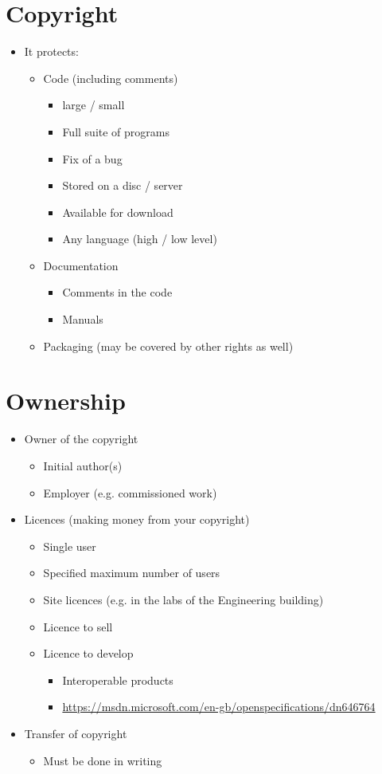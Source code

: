 \documentclass{article}
\begin{document}
\section{Copyright}
\begin{itemize}
\item It protects:
\begin{itemize}
\item Code (including comments)
\begin{itemize}
\item large / small
\item Full suite of programs
\item Fix of a bug
\item Stored on a disc / server
\item Available for download
\item Any language (high / low level)
\end{itemize}
\item Documentation
\begin{itemize}
\item Comments in the code
\item Manuals
\end{itemize}
\item Packaging (may be covered by other rights as well)
\end{itemize}
\end{itemize}



\section{Ownership}
\begin{itemize}
\item Owner of the copyright
\begin{itemize}
\item Initial author(s)
\item Employer (e.g. commissioned work)
\end{itemize}
\item Licences (making money from your copyright)
\begin{itemize}
\item Single user
\item Specified maximum number of users
\item Site licences (e.g. in the labs of the Engineering building)
\item Licence to sell
\item Licence to develop
\begin{itemize}
\item Interoperable products 
\item \url{https://msdn.microsoft.com/en-gb/openspecifications/dn646764}
\end{itemize}
\end{itemize}
\item Transfer of copyright
\begin{itemize}
\item Must be done in writing
\end{itemize}
\end{itemize}
\end{document}
